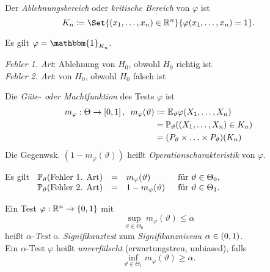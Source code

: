 \documentclass{cheat-sheet}
\renewcommand{\P}{\mathbb{P}} %
\newcommand{\E}{\mathbb{E}} %
\newcommand{\ind}{\mathbbm{1}} %
\begin{document}
\begin{defn}
  Der \emph{Ablehnungsbereich} oder \emph{kritische Bereich} von $\varphi$ ist
  \[ K_n \coloneqq \Set{(x_1, \ldots, x_n) \in \R^n}{\varphi(x_1, \ldots, x_n) = 1}. \]
\end{defn}

\begin{bem}
  Es gilt $\varphi = \ind_{K_n}$.
\end{bem}

\begin{defn}
  \begin{minipage}[t]{0.88 \linewidth}
    \emph{Fehler 1. Art}: \enspace Ablehnung von $H_0$, obwohl $H_0$ richtig ist \\
    \emph{Fehler 2. Art}: \enspace {}\phantom{Ablehnung} von $H_0$, obwohl $H_0$ falsch ist
  \end{minipage}
\end{defn}


\begin{defn}
  Die \emph{Güte- oder Machtfunktion} des Tests $\varphi$ ist
  \begin{align*}
    m_\varphi : \Theta \to \cinterval{0}{1}, \enspace
    m_\varphi(\vartheta) & \coloneqq
    \E_\vartheta \varphi(X_1, \ldots, X_n) \\
    & = \P_\vartheta ((X_1, \ldots, X_n) \in K_n) \\
    & = (P_\vartheta \times \ldots \times P_\vartheta)(K_n)
  \end{align*}
  Die Gegenwsk. $(1 {-} m_\varphi(\vartheta))$ heißt \emph{Operationscharakteristik} von $\varphi$.
\end{defn}

\begin{bem}
  Es gilt \enspace
  $\begin{array}[t]{r c l l}
    \P_\vartheta(\text{Fehler 1. Art}) &=& m_\varphi(\vartheta) & \enspace\text{für $\vartheta \in \Theta_0$,} \\
    \P_\vartheta(\text{Fehler 2. Art}) &=& 1 - m_\varphi(\vartheta) & \enspace\text{für $\vartheta \in \Theta_1$.}
  \end{array}$
\end{bem}


\begin{defn}
  Ein Test $\varphi : \mathbb{R}^n \to \{ 0, 1 \}$ mit
  \[ \sup_{\vartheta \in \Theta_0} m_\varphi(\vartheta) \leq \alpha \]
  heißt \emph{$\alpha$-Test} o. \emph{Signifikanztest} zum \emph{Signifikanzniveau} $\alpha \in \left( 0, 1 \right)$. \\[2pt]
  Ein $\alpha$-Test $\varphi$ heißt \emph{unverfälscht} (erwartungstreu, unbiased), falls
  \[ \inf_{\vartheta \in \Theta_1} m_\varphi(\vartheta) \geq \alpha. \]
\end{defn}
\end{document}
